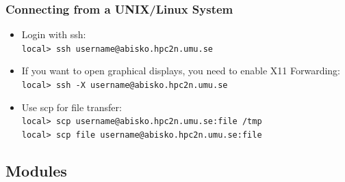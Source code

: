 \begin{frame}
	\frametitle{Connecting from a UNIX/Linux System}

	\begin{itemize}
		\item	Login with ssh:\\
		 \texttt{local> ssh username@abisko.hpc2n.umu.se}
		\item	If you want to open graphical displays, you need
				to enable X11 Forwarding:\\
		 \texttt{local> ssh -X username@abisko.hpc2n.umu.se}
		\item	Use scp for file transfer:\\
		 \texttt{local> scp username@abisko.hpc2n.umu.se:file /tmp}\\
		 \texttt{local> scp file username@abisko.hpc2n.umu.se:file}
	\end{itemize}

\end{frame}

\subsection{Modules}

